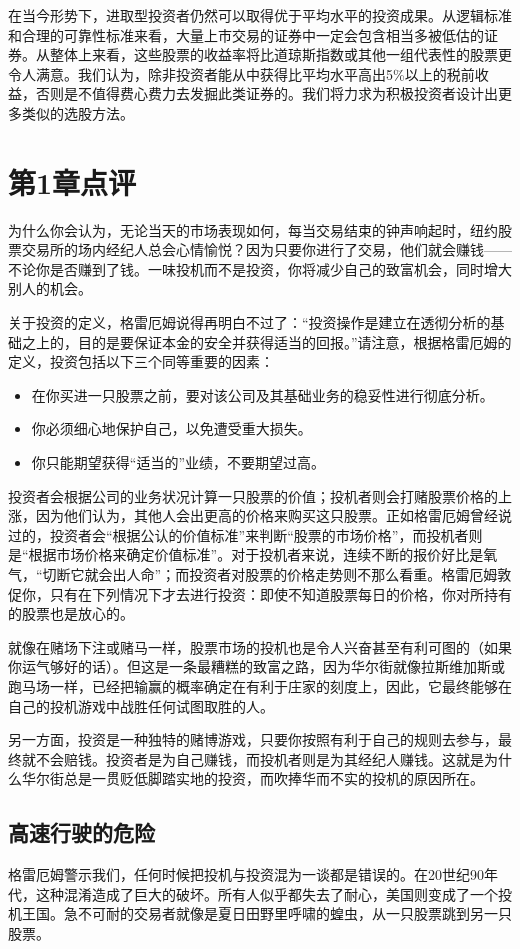 \documentclass[12pt,oneside]{book}
\begin{document}
在当今形势下，进取型投资者仍然可以取得优于平均水平的投资成果。从逻辑标准和合理的可靠性标准来看，大量上市交易的证券中一定会包含相当多被低估的证券。从整体上来看，这些股票的收益率将比道琼斯指数或其他一组代表性的股票更令人满意。我们认为，除非投资者能从中获得比平均水平高出5\%以上的税前收益，否则是不值得费心费力去发掘此类证券的。我们将力求为积极投资者设计出更多类似的选股方法。


\chapter{第1章点评}
为什么你会认为，无论当天的市场表现如何，每当交易结束的钟声响起时，纽约股票交易所的场内经纪人总会心情愉悦？因为只要你进行了交易，他们就会赚钱——不论你是否赚到了钱。一味投机而不是投资，你将减少自己的致富机会，同时增大别人的机会。

关于投资的定义，格雷厄姆说得再明白不过了：“投资操作是建立在透彻分析的基础之上的，目的是要保证本金的安全并获得适当的回报。”请注意，根据格雷厄姆的定义，投资包括以下三个同等重要的因素：

\begin{itemize}
\item 在你买进一只股票之前，要对该公司及其基础业务的稳妥性进行彻底分析。
\item 你必须细心地保护自己，以免遭受重大损失。
\item 你只能期望获得“适当的”业绩，不要期望过高。
\end{itemize}


投资者会根据公司的业务状况计算一只股票的价值；投机者则会打赌股票价格的上涨，因为他们认为，其他人会出更高的价格来购买这只股票。正如格雷厄姆曾经说过的，投资者会“根据公认的价值标准”来判断“股票的市场价格”，而投机者则是“根据市场价格来确定价值标准”。对于投机者来说，连续不断的报价好比是氧气，“切断它就会出人命”；而投资者对股票的价格走势则不那么看重。格雷厄姆敦促你，只有在下列情况下才去进行投资：即使不知道股票每日的价格，你对所持有的股票也是放心的。

就像在赌场下注或赌马一样，股票市场的投机也是令人兴奋甚至有利可图的（如果你运气够好的话）。但这是一条最糟糕的致富之路，因为华尔街就像拉斯维加斯或跑马场一样，已经把输赢的概率确定在有利于庄家的刻度上，因此，它最终能够在自己的投机游戏中战胜任何试图取胜的人。

另一方面，投资是一种独特的赌博游戏，只要你按照有利于自己的规则去参与，最终就不会赔钱。投资者是为自己赚钱，而投机者则是为其经纪人赚钱。这就是为什么华尔街总是一贯贬低脚踏实地的投资，而吹捧华而不实的投机的原因所在。

\section{高速行驶的危险}
格雷厄姆警示我们，任何时候把投机与投资混为一谈都是错误的。在20世纪90年代，这种混淆造成了巨大的破坏。所有人似乎都失去了耐心，美国则变成了一个投机王国。急不可耐的交易者就像是夏日田野里呼啸的蝗虫，从一只股票跳到另一只股票。
\end{document}
